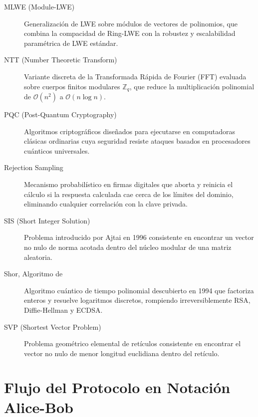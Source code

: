\documentclass[11pt,a4paper,twoside,openright]{book}
\theoremstyle{plain}
\theoremstyle{definition}
\theoremstyle{remark}
\newcommand{\Zq}{\mathbb{Z}_q}
\begin{document}
\begin{description}
  \item[MLWE (Module-LWE)] Generalizaci\'on de LWE sobre m\'odulos de vectores de polinomios, que combina la compacidad de Ring-LWE con la robustez y escalabilidad param\'etrica de LWE est\'andar.
  
  \item[NTT (Number Theoretic Transform)] Variante discreta de la Transformada R\'apida de Fourier (FFT) evaluada sobre cuerpos finitos modulares $\Zq$, que reduce la multiplicaci\'on polinomial de $\mathcal{O}(n^2)$ a $\mathcal{O}(n \log n)$.
  
  \item[PQC (Post-Quantum Cryptography)] Algoritmos criptogr\'aficos dise\~nados para ejecutarse en computadoras cl\'asicas ordinarias cuya seguridad resiste ataques basados en procesadores cu\'anticos universales.
  
  \item[Rejection Sampling] Mecanismo probabil\'istico en firmas digitales que aborta y reinicia el c\'alculo si la respuesta calculada cae cerca de los l\'imites del dominio, eliminando cualquier correlaci\'on con la clave privada.
  
  \item[SIS (Short Integer Solution)] Problema introducido por Ajtai en 1996 consistente en encontrar un vector no nulo de norma acotada dentro del n\'ucleo modular de una matriz aleatoria.
  
  \item[Shor, Algoritmo de] Algoritmo cu\'antico de tiempo polinomial descubierto en 1994 que factoriza enteros y resuelve logaritmos discretos, rompiendo irreversiblemente RSA, Diffie-Hellman y ECDSA.
  
  \item[SVP (Shortest Vector Problem)] Problema geom\'etrico elemental de ret\'iculos consistente en encontrar el vector no nulo de menor longitud euclidiana dentro del ret\'iculo.
\end{description}

\chapter{Flujo del Protocolo en Notaci\'on Alice-Bob}
\label{app:alice_bob_completo}
\end{document}
